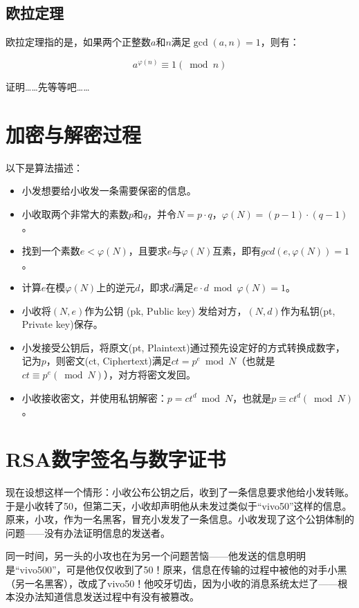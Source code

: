 \documentclass[a4paper]{article}  %
\begin{document}
\begin{sloppypar}
\subsection[欧拉定理]{欧拉定理}

欧拉定理指的是，如果两个正整数$a$和$n$满足$\gcd(a, n) = 1$，则有：

\[
	a^{\varphi(n)} \equiv 1 (\bmod n)
\]

证明……先等等吧……
\section[算法描述]{加密与解密过程} \label{加密与解密过程}

以下是算法描述：
\begin{itemize}
	\item 小发想要给小收发一条需要保密的信息。
	\item 小收取两个非常大的素数$p$和$q$，并令$N = p \cdot q$，$\varphi(N) = (p - 1) \cdot (q - 1)$。
	\item 找到一个素数$e < \varphi(N)$，且要求$e$与$\varphi(N)$互素，即有$gcd(e, \varphi(N)) = 1$。 %
	\item 计算$e$在模$\varphi(N)$上的逆元$d$，即求$d$满足$e \cdot d \bmod \varphi(N) = 1$。
	\item 小收将$(N, e)$作为公钥 (pk, Public key) 发给对方，$(N, d)$作为私钥(pt, Private key)保存。
	\item 小发接受公钥后，将原文(pt, Plaintext)通过预先设定好的方式转换成数字，记为$p$，则密文(ct, Ciphertext)满足$ct = p ^ e \bmod N$（也就是$ct \equiv p ^ e (\bmod N)$），对方将密文发回。
	\item 小收接收密文，并使用私钥解密：$p = ct ^ d \bmod N$，也就是$p \equiv ct ^ d (\bmod N)$。
\end{itemize}

\section{RSA数字签名与数字证书}

现在设想这样一个情形：小收公布公钥之后，收到了一条信息要求他给小发转账。于是小收转了50，但第二天，小收却声明他从未发过类似于“vivo50”这样的信息。原来，小攻，作为一名黑客，冒充小发发了一条信息。小收发现了这个公钥体制的问题——没有办法证明信息的发送者。

同一时间，另一头的小攻也在为另一个问题苦恼——他发送的信息明明是“vivo500”，可是他仅仅收到了50！原来，信息在传输的过程中被他的对手小黑（另一名黑客），改成了vivo50！他咬牙切齿，因为小收的消息系统太烂了——根本没办法知道信息发送过程中有没有被篡改。


\end{sloppypar}
\end{document}
